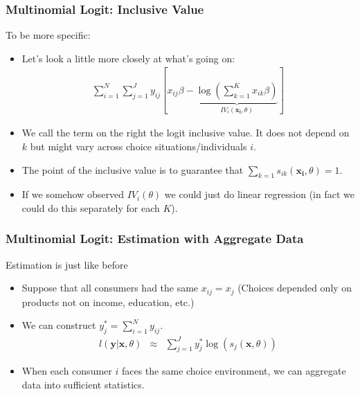 \documentclass[xcolor=pdftex,dvipsnames,table,mathserif]{beamer}
\begin{document}
\begin{frame}
\frametitle{Multinomial Logit: Inclusive Value}
To be more specific:
\begin{itemize}
\item Let's look a little more closely at what's going on:
\begin{eqnarray*}
\sum_{i=1}^N \sum_{j=1}^J  y_{ij} \left[ x_{ij} \beta - \underbrace{\log \left(\sum_{k=1}^K x_{ik} \beta  \right)}_{IV_i(\mathbf{x_i},\theta)} \right]
\end{eqnarray*}
\item We call the term on the right the \alert{logit inclusive value}. It does not depend on $k$ but might vary across choice situations/individuals $i$.
\item The point of the inclusive value is to guarantee that $\sum_{k=1} s_{ik}(\mathbf{x_i},\theta) = 1$.
\item If we somehow observed $IV_i(\theta)$ we could just do linear regression (in fact we could do this separately for each $K$).
\end{itemize}
\end{frame}


\begin{frame}
\frametitle{Multinomial Logit: Estimation with Aggregate Data}
Estimation is just like before
\begin{itemize}
\item  Suppose that all consumers had the same $x_{ij} = x_{j}$ (Choices depended only on products not on income, education, etc.)
\item We can construct $y_{j}^* = \sum_{i=1}^N y_{ij}$.
\begin{eqnarray*}
l(\mathbf{y} | \mathbf{x}, \theta) &\approx& \sum_{j=1}^J  y_{j}^{*} \log( s_{j}(\mathbf{x},\theta))
\end{eqnarray*}
\item When each consumer $i$ faces the same choice environment, we can aggregate data into \alert{sufficient statistics}.
\end{itemize}
\end{frame}
\end{document}

